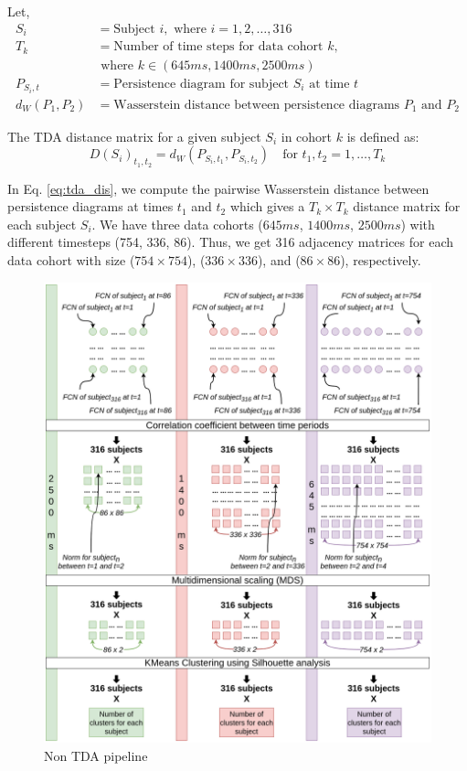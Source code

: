 Let,
\begin{align*}
S_i & = \text{Subject } i, \text{ where } i = 1,2,\ldots,316 \\
T_k & = \text{Number of time steps for data cohort } k, 
\\
& \text{ where } k\in(645ms, 1400ms, 2500ms) \\
P_{S_i,t} & = \text{Persistence diagram for subject } S_i \text{ at time } t \\
d_W(P_1,P_2) & = \text{Wasserstein distance between persistence diagrams } P_1 \text{ and } P_2
\end{align*}

The TDA distance matrix for a given subject $S_i$ in cohort $k$ is defined as:
\begin{equation}
D(S_i)_{t_1,t_2} = d_W(P_{S_i,t_1}, P_{S_i,t_2}) \quad \text{for } t_1, t_2 = 1, \ldots, T_k \label{eq:tda_dis}
\end{equation}

In Eq. \ref{eq:tda_dis}, we compute the pairwise Wasserstein distance between persistence diagrams at times $t_1$ and $t_2$ which gives a $T_k \times T_k$ distance matrix for each subject $S_i$. We have three data cohorts ($645ms$, $1400ms$, $2500ms$) with different timesteps (754, 336, 86). Thus, we get 316 adjacency matrices for each data cohort with size ($754 \times 754$), ($336 \times 336$), and ($86 \times 86$), respectively.

\begin{figure}[!ht]%
	\centering	
	\includegraphics[height=0.9\textheight]{figures/non_tda_pipeline.png}
	\caption{Non TDA pipeline}
	\label{fig:nontda_pipeline}
\end{figure}

